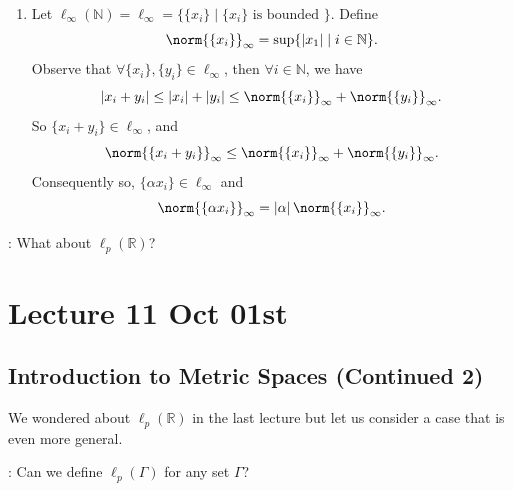 \documentclass[notoc,notitlepage]{tufte-book}
\begin{document}
\begin{eg}
\begin{enumerate}
    \item Let $\ell_\infty(\mathbb{N}) = \ell_\infty = \{ \{ x_i \} \mid \{ x_i \} \text{ is bounded } \}$. Define
      \begin{equation*}
        \norm{ \{ x_i \} }_\infty = \sup \{ \abs{ x_1 } \mid i \in \mathbb{N} \}.
      \end{equation*}
      Observe that $\forall \{ x_i \}, \{ y_i \} \in \ell_\infty$, then $\forall i \in \mathbb{N}$, we have
      \begin{equation*}
        \abs{x_i + y_i} \leq \abs{ x_i } + \abs{ y_i } \leq \norm{\{x_i\}}_\infty + \norm{\{y_i\}}_\infty.
      \end{equation*}
      So $\{ x_i + y_i \} \in \ell_\infty$, and
      \begin{equation*}
        \norm{ \{ x_i + y_i \} }_\infty \leq \norm{ \{ x_i\} }_\infty + \norm{ \{ y_i \} }_\infty.
      \end{equation*}
      Consequently so, $\{ \alpha x_i \} \in \ell_\infty$ and
      \begin{equation*}
        \norm{ \{ \alpha x_i \} }_\infty = \abs{ \alpha } \norm{ \{ x_i \} }_\infty.
      \end{equation*}
  \end{enumerate}
\end{eg}

: What about $\ell_p(\mathbb{R})$?



\chapter{Lecture 11 Oct 01st}%
\label{chp:lecture_11_oct_01st}

\section{Introduction to Metric Spaces (Continued 2)}%
\label{sec:introduction_to_metric_spaces_continued_2}

We wondered about $\ell_p(\mathbb{R})$ in the last lecture but let us consider a case that is even more general.

: Can we define $\ell_p(\Gamma)$ for any set $\Gamma$?
\end{document}
